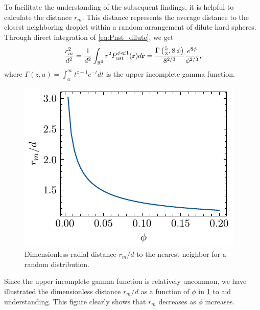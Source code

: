 To facilitate the understanding of the subsequent findings, it is helpful to calculate the distance $r_m$. 
This distance represents the average distance to the closest neighboring droplet within a random arrangement of dilute hard spheres. 
Through direct integration of \ref{eq:Pnst_dilute}, we get
\begin{align}
    \frac{r_m^2}{d^2}
    = 
    \frac{1}{d^2}
    \int_{\mathbb{R}^3} r^2 P_\text{nst}^{\phi \ll 1}(\textbf{r}) d\textbf{r} 
    =  \frac{\Gamma\left({{5}\over{3}} , 8\,\phi\right)}{8^{2/3}}\frac{e^{8\phi}}{\phi^{2/3}},
\end{align}
where $\Gamma(z,a) = \int_a^\infty t^{z-1} e^{-t} dt$ is the upper incomplete gamma function.
\begin{figure}
  \centering
  \includegraphics[height = 0.3\textwidth]{image/HOMOGENEOUS_final/PA/rm.pdf}
  \caption{Dimensionless radial distance $r_m/d$ to the nearest neighbor for a random distribution.}
  \label{fig:agee}
\end{figure}
Since the upper incomplete gamma function is relatively uncommon, we have illustrated the dimensionless distance $r_m/d$ as a function of $\phi$ in \ref{fig:agee} to aid understanding. This figure clearly shows that $r_m$ decreases as $\phi$ increases.


